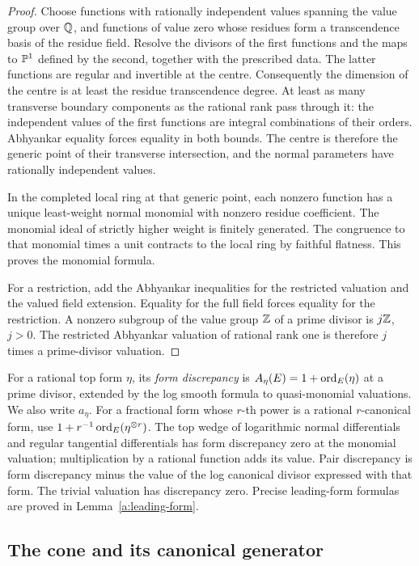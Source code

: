 \begin{proof}
Choose functions with rationally independent values spanning the value
group over \(\mathbb Q\), and functions of value zero whose residues form a
transcendence basis of the residue field. Resolve the divisors of the
first functions and the maps to \(\mathbb P^1\) defined by the second, together
with the prescribed data. The latter functions are regular and invertible
at the centre. Consequently the dimension of the centre is at least the
residue transcendence degree. At least as many transverse boundary
components as the rational rank pass through it: the independent values
of the first functions are integral combinations of their orders.
Abhyankar equality forces equality in both bounds. The centre is therefore
the generic point of their transverse intersection, and the normal
parameters have rationally independent values.

In the completed local ring at that generic point, each nonzero function
has a unique least-weight normal monomial with nonzero residue coefficient.
The monomial ideal of strictly higher weight is finitely generated.
The congruence to that monomial times a unit contracts to the local ring
by faithful flatness. This proves the monomial formula.

For a restriction, add the Abhyankar inequalities for the restricted
valuation and the valued field extension. Equality for the full field
forces equality for the restriction. A nonzero subgroup of the value
group \(\mathbb Z\) of a prime divisor is \(j\mathbb Z\), \(j>0\). The restricted
Abhyankar valuation of rational rank one is therefore \(j\) times a
prime-divisor valuation.
\end{proof}

For a rational top form \(\eta\), its \emph{form discrepancy} is
\(A_\eta(E)=1+\operatorname{ord}_E(\eta)\) at a prime divisor, extended by the
log smooth formula to quasi-monomial valuations. We also write \(a_\eta\).
For a fractional form whose \(r\)-th power is a rational \(r\)-canonical
form, use \(1+r^{-1}\operatorname{ord}_E(\eta^{\otimes r})\).
The top wedge of logarithmic normal differentials and regular tangential
differentials has form discrepancy zero at the monomial valuation;
multiplication by a rational function adds its value.
Pair discrepancy is form discrepancy minus the value of the
log canonical divisor expressed with that form. The trivial valuation
has discrepancy zero. Precise leading-form formulas are proved in
Lemma~\ref{a:leading-form}.

\subsection{The cone and its canonical generator}

